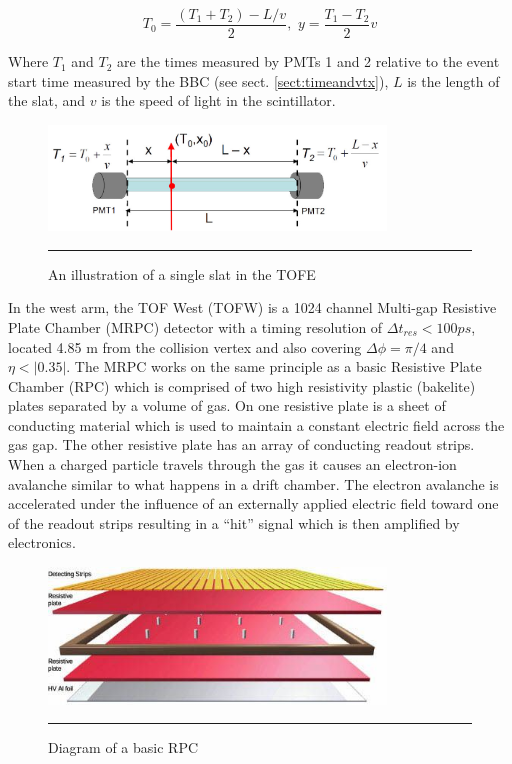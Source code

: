 \begin{equation}
T_{0} = \frac{(T_{1}+T_{2})-L/v}{2} , \, \, y = \frac{T_{1}-T_{2}}{2} v
\end{equation}

Where $T_1$ and $T_{2}$ are the times measured by PMTs 1 and 2 relative to the event start time measured by the BBC (see sect. \ref{sect:timeandvtx}), $L$ is the length of the slat, and $v$ is the speed of light in the scintillator.

\begin{figure}[htbp]
  \centering
    \includegraphics[width=0.8\textwidth]{Figures/TOFEcartoon.jpg}
    \rule{35em}{0.5pt}
  \caption[An illustration of a single slat in the TOFE]{An illustration of a single slat in the TOFE}
  \label{fig:TOFEcartoon}
\end{figure}

In the west arm, the TOF West (TOFW) is a 1024 channel Multi-gap Resistive Plate Chamber (MRPC) detector with a timing resolution of $\Delta t_{res} < 100 ps$, located 4.85 m from the collision vertex and also covering $\Delta\phi = \pi / 4$ and $\eta < |0.35|$. The MRPC works on the same principle as a basic Resistive Plate Chamber (RPC) which is comprised of two high resistivity plastic (bakelite) plates separated by a volume of gas. On one resistive plate is a sheet of conducting material which is used to maintain a constant electric field across the gas gap. The other resistive plate has an array of conducting readout strips. When a charged particle travels through the gas it causes an electron-ion avalanche similar to what happens in a drift chamber. The electron avalanche is accelerated under the influence of an externally applied electric field toward one of the readout strips resulting in a ``hit'' signal which is then amplified by electronics. 

\begin{figure}[h]
  \centering
    \includegraphics[width=0.8\textwidth]{Figures/RPClayers.jpg}
    \rule{35em}{0.5pt}
  \caption[Diagram of a basic RPC]{Diagram of a basic RPC \citep{CMSRPC}}
  \label{fig:RPCbasic}
\end{figure}

